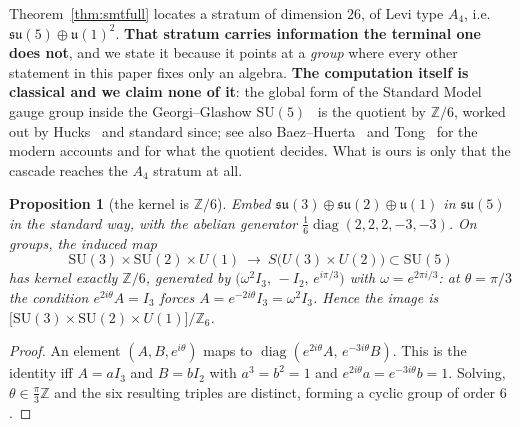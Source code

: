 \documentclass[11pt,reqno]{amsart}
\theoremstyle{plain}
\newtheorem{proposition}[theorem]{Proposition}
\theoremstyle{definition}
\theoremstyle{remark}
\newcommand{\Z}{\mathbb{Z}}
\newcommand{\SU}{\mathrm{SU}}
\newcommand{\su}{\mathfrak{su}}
\newcommand{\uu}{\mathfrak{u}}
\begin{document}
Theorem~\ref{thm:smtfull} locates a stratum of dimension $26$, of Levi type $A_4$, i.e.\
$\su(5)\oplus\uu(1)^2$. \textbf{That stratum carries information the terminal one does
not}, and we state it because it points at a \emph{group} where every other statement in
this paper fixes only an algebra. \textbf{The computation itself is classical and we
claim none of it}: the global form of the Standard Model gauge group inside the
Georgi--Glashow $\SU(5)$~\cite{GeorgiGlashow} is the quotient by $\Z/6$, worked out by
Hucks~\cite{Hucks} and standard since; see also Baez--Huerta~\cite{BaezHuerta} and
Tong~\cite{Tong} for the modern accounts and for what the quotient decides. What is ours
is only that the cascade reaches the $A_4$ stratum at all.

\begin{proposition}[the kernel is $\Z/6$]\label{prop:z6}
Embed $\su(3)\oplus\su(2)\oplus\uu(1)$ in $\su(5)$ in the standard way, with the abelian
generator $\tfrac16\operatorname{diag}(2,2,2,-3,-3)$. On groups, the induced map
\[
   \SU(3)\times\SU(2)\times U(1)\ \longrightarrow\ S\bigl(U(3)\times U(2)\bigr)\subset\SU(5)
\]
has kernel exactly $\Z/6$, generated by
$\bigl(\omega^2 I_3,\,-I_2,\,e^{i\pi/3}\bigr)$ with $\omega=e^{2\pi i/3}$: at
$\theta=\pi/3$ the condition $e^{2i\theta}A=I_3$ forces $A=e^{-2i\theta}I_3=\omega^2I_3$. Hence the image
is $\bigl[\SU(3)\times\SU(2)\times U(1)\bigr]/\Z_6$.
\end{proposition}

\begin{proof}
An element $(A,B,e^{i\theta})$ maps to $\operatorname{diag}(e^{2i\theta}A,\,e^{-3i\theta}B)$.
This is the identity iff $A=aI_3$ and $B=bI_2$ with $a^3=b^2=1$ and
$e^{2i\theta}a=e^{-3i\theta}b=1$. Solving, $\theta\in\tfrac{\pi}{3}\Z$ and the six
resulting triples are distinct, forming a cyclic group of order $6$.
\end{proof}
\end{document}
